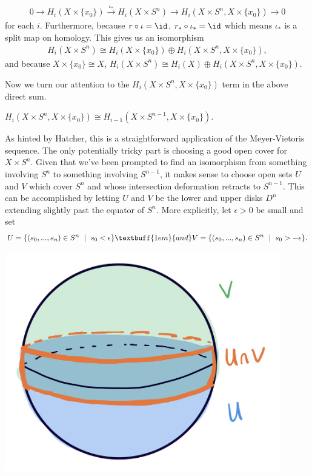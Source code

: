 \begin{homework}[e]
\begin{prf}
\begin{prf}
\begin{align*}
        0 \to H_{i}(X\times \{x_0\}) \xrightarrow{\iota_*} H_i(X\times S^n) \to H_{i}(X\times S^n,X\times \{x_0\})\to 0
      \end{align*}
      for each $i$. Furthermore, because $r\circ \iota = \id$, $r_*\circ \iota_* = \id$ which means $\iota_*$ is a split map on homology. This gives us an isomorphism
      \begin{align*}
        H_i(X\times S^n) \cong H_i(X\times \{x_0\}) \oplus H_i(X\times S^n,X\times \{x_0\}),
      \end{align*}
      and because $X\times \{x_0\}\cong X$, $H_i(X\times S^n) \cong H_i(X) \oplus H_i(X\times S^n,X\times \{x_0\})$.
    \end{prf}

    Now we turn our attention to the $H_i(X\times S^n,X\times \{x_0\})$ term in the above direct sum.
    \begin{lem}\label{lem:problem2.2.36b}
      $H_i(X\times S^n,X\times \{x_0\}) \cong H_{i-1}(X\times S^{n-1}, X\times \{x_0\})$.
    \end{lem}
    \begin{prf}
      As hinted by Hatcher, this is a straightforward application of the Meyer-Vietoris sequence. The only potentially tricky part is choosing a good open cover for $X\times S^n$. Given that we've been prompted to find an isomorphism from something involving $S^n$ to something involving $S^{n-1}$, it makes sense to choose open sets $U$ and $V$ which cover $S^n$ and whose intersection deformation retracts to $S^{n-1}$. This can be accomplished by letting $U$ and $V$ be the lower and upper disks $D^n$ extending slightly past the equator of $S^n$. More explicitly, let $\epsilon > 0$ be small and set
      \begin{align*}
        U = \{(s_0,...,s_n) \in S^n ~ \mid~ s_0 < \epsilon\} \textbuff{1em}{and} V = \{(s_0,...,s_n) \in S^n ~ \mid~ s_0 > -\epsilon\}.
      \end{align*}
      \begin{center}
        \includegraphics[width=12cm]{figures/hwk9-fig4.png}

\end{center}
\end{prf}
\end{prf}
\end{homework}
